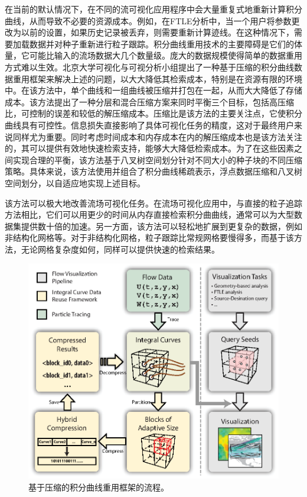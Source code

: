 在当前的默认情况下，在不同的流可视化应用程序中会大量重复式地重新计算积分曲线，从而导致不必要的资源成本。例如，在FTLE分析中，当一个用户将参数更改为以前的设置，如果历史记录被丢弃，则需要重新计算迹线。在这种情况下，需要加载数据并对种子重新进行粒子跟踪。积分曲线重用技术的主要障碍是它们的体量，它可能比输入的流场数据大几个数量级。庞大的数据规模使得简单的数据重用方式难以生效。北京大学可视化与可视分析小组提出了一种基于压缩的积分曲线数据重用框架\parencite{hong2017compression}来解决上述的问题，以大大降低其检索成本，特别是在资源有限的环境中。在该方法中，单个曲线和一组曲线被压缩并打包在一起，从而大大降低了存储成本。该方法提出了一种分层和混合压缩方案来同时平衡三个目标，包括高压缩比，可控制的误差和较低的解压缩成本。压缩比是该方法的主要关注点，它使积分曲线具有可控性。信息损失直接影响了具体可视化任务的精度，这对于最终用户来说同样尤为重要。同时考虑时间成本和内存成本在内的解压缩成本也是该方法关注的，其可以提供有效地快速检索支持，能够大大降低检索成本。为了在这些因素之间实现合理的平衡，该方法基于八叉树空间划分针对不同大小的种子块的不同压缩策略。具体来说，该方法使用并组合了积分曲线稀疏表示，浮点数据压缩和八叉树空间划分，以自适应地实现上述目标。

该方法可以极大地改善流场可视化任务。在流场可视化应用中，与直接的粒子追踪方法相比，它们可以用更少的时间从内存直接检索积分曲曲线，通常可以为大型数据集提供数十倍的加速。另一方面，该方法可以轻松地扩展到更复杂的数据，例如非结构化网格等。对于非结构化网格，粒子跟踪比常规网格要慢得多，而基于该方法，无论网格复杂度如何，同样可以提供快速的检索结果。

\begin{figure}[htbp]
	\centering
	\includegraphics[width=.7\columnwidth]{image/linecompress/workflow.eps}
	\caption{
	基于压缩的积分曲线重用框架的流程。\parencite{hong2017compression}
	}
	\label{fig:workflow}
\end{figure}

